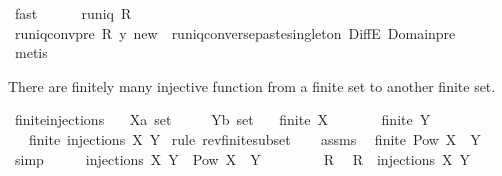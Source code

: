 \begin{isabellebody}
\ fast\isanewline
\isanewline
\ \ \ \ \isamarkupfalse%
\ {\isachardoublequoteopen}runiq\ {\isacharparenleft}R{\isasyminverse}{\isacharparenright}{\isachardoublequoteclose}\isanewline
\ \ \ \ \ \ \isamarkupfalse%
\ runiq{\isacharunderscore}conv{\isacharunderscore}pre\ R\ y\ new\ \ runiq{\isacharunderscore}converse{\isacharunderscore}paste{\isacharunderscore}singleton\ DiffE\ Domain{\isacharunderscore}pre\isanewline
\ \ \ \ \ \ \isamarkupfalse%
\ metis\isanewline
\ \ \isamarkupfalse%
\isanewline
{}\isamarkupfalse%
%
\endisatagproof
{\isafoldproof}%
%
\isadelimproof
%
\endisadelimproof
%
\begin{isamarkuptext}%
There are finitely many injective function from a finite set to another finite set.%
\end{isamarkuptext}%
\isamarkuptrue%
\isamarkupfalse%
\ finite{\isacharunderscore}injections{\isacharcolon}\isanewline
\ \ \ X{\isacharcolon}{\isacharcolon}{\isachardoublequoteopen}{\isacharprime}a\ set{\isachardoublequoteclose}\isanewline
\ \ \ \ \ Y{\isacharcolon}{\isacharcolon}{\isachardoublequoteopen}{\isacharprime}b\ set{\isachardoublequoteclose}\isanewline
\ \ \ {\isachardoublequoteopen}finite\ X{\isachardoublequoteclose}\isanewline
\ \ \ \ \ \ \ {\isachardoublequoteopen}finite\ Y{\isachardoublequoteclose}\isanewline
\ \ \ {\isachardoublequoteopen}finite\ {\isacharparenleft}injections\ X\ Y{\isacharparenright}{\isachardoublequoteclose}\isanewline
%
\isadelimproof
%
\endisadelimproof
%
\isatagproof
{}\isamarkupfalse%
\ {\isacharparenleft}rule\ rev{\isacharunderscore}finite{\isacharunderscore}subset{\isacharparenright}\isanewline
\ \ \isamarkupfalse%
\ assms\ \isamarkupfalse%
\ {\isachardoublequoteopen}finite\ {\isacharparenleft}Pow\ {\isacharparenleft}X\ {\isasymtimes}\ Y{\isacharparenright}{\isacharparenright}{\isachardoublequoteclose}\ \isamarkupfalse%
\ simp\isanewline
\ \ \isamarkupfalse%
\ \isamarkupfalse%
\ {\isachardoublequoteopen}injections\ X\ Y\ {\isasymsubseteq}\ Pow\ {\isacharparenleft}X\ {\isasymtimes}\ Y{\isacharparenright}{\isachardoublequoteclose}\isanewline
\ \ \isamarkupfalse%
\isanewline
\ \ \ \ \isamarkupfalse%
\ R\ \isamarkupfalse%
\ {\isachardoublequoteopen}R\ {\isasymin}\ {\isacharparenleft}injections\ X\ Y{\isacharparenright}{\isachardoublequoteclose}\isanewline

\end{isabellebody}

